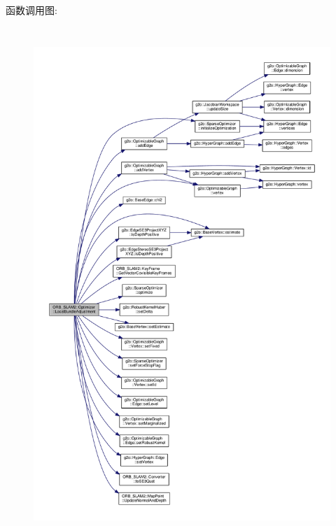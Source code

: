 函数调用图\-:
\nopagebreak
\begin{figure}[H]
\begin{center}
\leavevmode
\includegraphics[height=550pt]{classORB__SLAM2_1_1Optimizer_ab70e0b4f366b65a0c1ae8b2def19d339_cgraph}
\end{center}
\end{figure}


